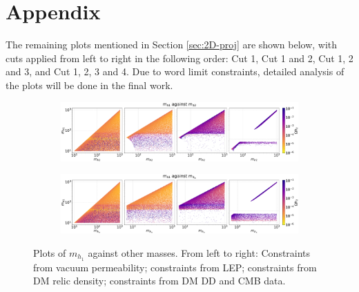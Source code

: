\documentclass[12pt]{article}
\begin{document}
\section{Appendix}
\label{sec:Appendix}
The remaining plots mentioned in Section \ref{sec:2D-proj} are shown below, with cuts applied from left to right in the following order: Cut 1, Cut 1 and 2, Cut 1, 2 and 3, and Cut 1, 2, 3 and 4. Due to word limit constraints, detailed analysis of the plots will be done in the final work.
\begin{figure}[H]
    \begin{subfigure}[b]{\columnwidth}
      \centering
      \includegraphics[width=1\columnwidth]{4plot/MD1_MD2.pdf}
    \end{subfigure}

    \begin{subfigure}[b]{\columnwidth}
      \centering
      \includegraphics[width=1\columnwidth]{4plot/MD1_MDP.pdf}
    \end{subfigure}
    \caption{Plots of $m_{h_1}$ against other masses. From left to right: Constraints from vacuum permeability; constraints from LEP; constraints from DM relic density; constraints from DM DD and CMB data.}
\end{figure}
\end{document}
